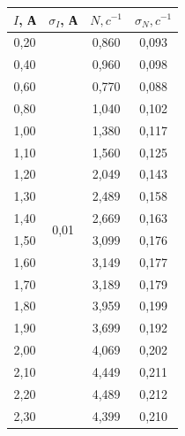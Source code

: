 \documentclass[a4paper,12pt]{report}
\begin{document}
\begin{table}[H]
\begin{tabular}{|c|c|c|c|}
\hline
$I$, А & $\sigma_{I}$, А              & $N, c^{-1}$ & $\sigma_{N},c^{-1}$ \\ \hline
0,20 & \multirow{24}{*}{0,01} & 0,860        & 0,093             \\ \cline{1-1} \cline{3-4} 
0,40 &                        & 0,960        & 0,098             \\ \cline{1-1} \cline{3-4} 
0,60 &                        & 0,770        & 0,088             \\ \cline{1-1} \cline{3-4} 
0,80 &                        & 1,040        & 0,102             \\ \cline{1-1} \cline{3-4} 
1,00 &                        & 1,380        & 0,117             \\ \cline{1-1} \cline{3-4} 
1,10 &                        & 1,560        & 0,125             \\ \cline{1-1} \cline{3-4} 
1,20 &                        & 2,049        & 0,143             \\ \cline{1-1} \cline{3-4} 
1,30 &                        & 2,489        & 0,158             \\ \cline{1-1} \cline{3-4} 
1,40 &                        & 2,669        & 0,163             \\ \cline{1-1} \cline{3-4} 
1,50 &                        & 3,099        & 0,176             \\ \cline{1-1} \cline{3-4} 
1,60 &                        & 3,149        & 0,177             \\ \cline{1-1} \cline{3-4} 
1,70 &                        & 3,189        & 0,179             \\ \cline{1-1} \cline{3-4} 
1,80 &                        & 3,959        & 0,199             \\ \cline{1-1} \cline{3-4} 
1,90 &                        & 3,699        & 0,192             \\ \cline{1-1} \cline{3-4} 
2,00 &                        & 4,069        & 0,202             \\ \cline{1-1} \cline{3-4} 
2,10 &                        & 4,449        & 0,211             \\ \cline{1-1} \cline{3-4} 
2,20 &                        & 4,489        & 0,212             \\ \cline{1-1} \cline{3-4} 
2,30 &                        & 4,399        & 0,210             \\ \cline{1-1} \cline{3-4} 

\end{tabular}
\end{table}
\end{document}
